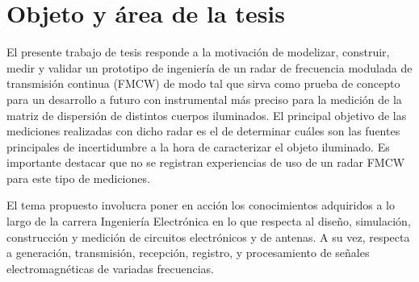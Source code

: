 \chapter{Objeto y área de la tesis} \label{ch:object}


El presente trabajo de tesis responde a la motivación de modelizar, construir, medir y validar un prototipo de ingeniería de un radar de frecuencia modulada de transmisión continua (FMCW) de modo tal que sirva como prueba de concepto para un desarrollo a futuro con instrumental más preciso para la medición de la matriz de dispersión de distintos cuerpos iluminados. El principal objetivo de las mediciones realizadas con dicho radar es el de determinar cuáles son las fuentes principales de incertidumbre a la hora de caracterizar el objeto iluminado. Es importante destacar que no se registran experiencias de uso de un radar FMCW para este tipo de mediciones.

El tema propuesto involucra poner en acción los conocimientos adquiridos a lo largo de la carrera Ingeniería Electrónica en lo que respecta al diseño, simulación, construcción y medición de circuitos electrónicos y de antenas. A su vez, respecta a generación, transmisión, recepción, registro, y procesamiento de señales electromagnéticas de variadas frecuencias.
